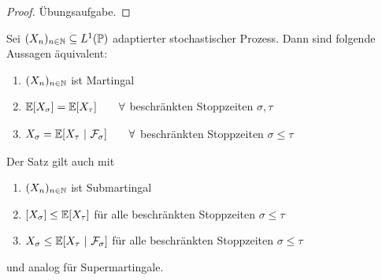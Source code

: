\begin{proof}
	Übungsaufgabe.
\end{proof}

\begin{theorem}\enter\label{theorem3.4}
	Sei $(X_n)_{n\in\mathbb{N}}\subseteq L^1(\mathbb{P})$ adaptierter stochastischer Prozess. Dann sind folgende Aussagen äquivalent:
	\begin{enumerate}[label=(\alph*)]
		\item $(X_n)_{n\in\mathbb{N}}$ ist Martingal
		\item $\begin{aligned}
			\mathbb{E}[X_\sigma]=\mathbb{E}[X_\tau]\qquad\forall
		\end{aligned}$ beschränkten Stoppzeiten $\sigma,\tau$
		\item $\begin{aligned}
			X_\sigma=\mathbb{E}[X_\tau~|~\mathcal{F}_\sigma]\qquad\forall
		\end{aligned}$  beschränkten Stoppzeiten $\sigma\leq\tau$
	\end{enumerate}
\end{theorem}

\begin{bemerkung}
	Der Satz gilt auch mit 
	\begin{enumerate}[label=(\alph*')]
		\item $(X_n)_{n\in\mathbb{N}}$ ist Submartingal
		\item $[X_\sigma]\leq\mathbb{E}[X_\tau]$ für alle beschränkten Stoppzeiten $\sigma\leq\tau$
		\item $X_\sigma\leq\mathbb{E}[X_\tau~|~\mathcal{F}_\sigma]$ für alle beschränkten Stoppzeiten $\sigma\leq\tau$
	\end{enumerate}
	und analog für Supermartingale.
\end{bemerkung}

